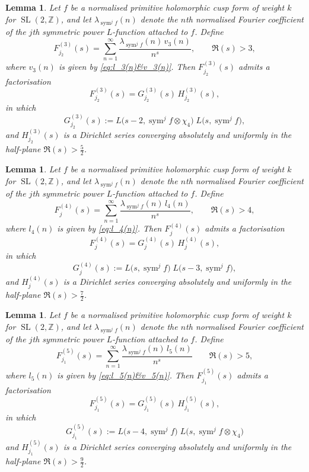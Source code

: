 \documentclass[10pt]{amsart}
\newtheorem{lemma}[theorem]{Lemma}
\begin{document}
\begin{lemma} \label{lem:F3''}
Let \(f\) be a normalised primitive holomorphic cusp form of weight \(k\) for \(\operatorname{SL}(2,\mathbb{Z})\), 
and let \(\lambda_{\operatorname{sym}^{j}f}(n)\) denote the \(n\)th normalised Fourier coefficient 
of the \(j\)th symmetric power \(L\)-function attached to \(f\). Define
\[
F_{j_2}^{(3)}(s)=\sum_{n=1}^{\infty}\frac{\lambda_{\operatorname{sym}^{j}f}(n)\,v_3(n)}{n^{s}}, \qquad \Re(s)>3,
\]
where \(v_3(n)\) is given by \eqref{eq:l_3(n)&v_3(n)}. Then \(F_{j_2}^{(3)}(s)\) admits a factorisation
\[
F_{j_2}^{(3)}(s)=G_{j_2}^{(3)}(s)\,H_{j_2}^{(3)}(s),
\]
in which
\[
G_{j_2}^{(3)}(s):=L\!\bigl(s-2,\operatorname{sym}^{j}f \otimes \chi_4\bigr)\; 
        L\!\bigl(s,\operatorname{sym}^{j}f\bigr),
\]
and \(H_{j_2}^{(3)}(s)\) is a Dirichlet series converging absolutely and uniformly 
in the half-plane \(\Re(s)>\frac{5}{2}\).
\end{lemma}

\begin{lemma} \label{lem:F4}
Let \(f\) be a normalised primitive holomorphic cusp form of weight \(k\) for \(\operatorname{SL}(2,\mathbb{Z})\), 
and let \(\lambda_{\operatorname{sym}^{j}f}(n)\) denote the \(n\)th normalised Fourier coefficient 
of the \(j\)th symmetric power \(L\)-function attached to \(f\).  Define
\[
F_{j}^{(4)}(s)=\sum_{n=1}^{\infty}\frac{\lambda_{\operatorname{sym}^{j}f}(n)\,l_4(n)}{n^{s}}, \qquad \Re(s)>4,
\]
where \(l_4(n)\) is given by \eqref{eq:l_4(n)}. Then \(F_{j}^{(4)}(s)\) admits a factorisation
\[
F_{j}^{(4)}(s)=G_{j}^{(4)}(s)\,H_{j}^{(4)}(s),
\]
in which
\[
G_{j}^{(4)}(s):=L\!\bigl(s,\operatorname{sym}^{j}f\bigr)\; 
        L\!\bigl(s-3,\operatorname{sym}^{j}f\bigr),
\]
and \(H_{j}^{(4)}(s)\) is a Dirichlet series converging absolutely and uniformly 
in the half-plane \(\Re(s)>\frac{7}{2}\).
\end{lemma}

\begin{lemma}\label{lem:F5'}
Let \(f\) be a normalised primitive holomorphic cusp form of weight \(k\) for \(\operatorname{SL}(2,\mathbb{Z})\), 
and let \(\lambda_{\operatorname{sym}^{j}f}(n)\) denote the \(n\)th normalised Fourier coefficient 
of the \(j\)th symmetric power \(L\)-function attached to \(f\). Define
\[
F_{j_1}^{(5)}(s)=\sum_{n=1}^{\infty}\frac{\lambda_{\operatorname{sym}^{j}f}(n)\,l_5(n)}{n^{s}} \qquad \Re(s)>5,
\]
where \(l_5(n)\) is given by \eqref{eq:l_5(n)&v_5(n)}. Then \(F_{j_1}^{(5)}(s)\) admits a factorisation
\[
F_{j_1}^{(5)}(s)=G_{j_1}^{(5)}(s)\,H_{j_1}^{(5)}(s),
\]
in which
\[
G_{j_1}^{(5)}(s):=L\!\bigl(s-4,\operatorname{sym}^{j}f\bigr)\; 
        L\!\bigl(s,\operatorname{sym}^{j}f\otimes\chi_4\bigr)
\]
and \(H_{j_1}^{(5)}(s)\) is a Dirichlet series converging absolutely and uniformly 
in the half-plane \(\Re(s)>\frac{9}{2}\).
\end{lemma}
\end{document}
